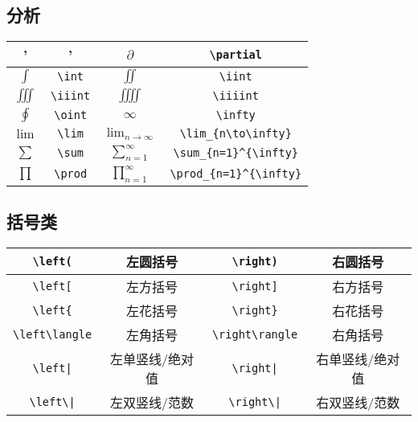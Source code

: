 \documentclass[a4paper,10pt]{ctexart}
\begin{document}
\subsection{分析}
\begin{table}[H]
	\begin{center}
		\begin{tabular}{|c|c|c|c|}
		\hline
		' &' &$\partial$ &\verb|\partial|\\
		\hline
		$\int$ &\verb|\int| &$\iint$ &\verb|\iint|\\
		\hline
		$\iiint$ &\verb|\iiint| &$\iiiint$ &\verb|\iiiint|\\
		\hline
		$\oint$ &\verb|\oint| &$\infty$ &\verb|\infty|\\
		\hline
		$\lim$ &\verb|\lim| &$\lim_{n\to\infty}$ &\verb|\lim_{n\to\infty}|\\
		\hline
		$\sum$ &\verb|\sum| &$\sum_{n=1}^{\infty}$ &\verb|\sum_{n=1}^{\infty}|\\
		\hline
		$\prod$ &\verb|\prod|&$\prod_{n=1}^{\infty}$ &\verb|\prod_{n=1}^{\infty}|\\
		\hline
		\end{tabular}
	\end{center}
\end{table}


\subsection{括号类}
\noindent
\begin{table}[H]
	\begin{center}
		\begin{tabular}{|c|c|c|c|}
		\hline
		\verb|\left(| &左圆括号 &\verb|\right)| &右圆括号\\
		\hline
		\verb|\left[| &左方括号 &\verb|\right]| &右方括号\\
		\hline
		\verb|\left{| &左花括号 &\verb|\right}| &右花括号\\
		\hline
		\verb|\left\langle| &左角括号 &\verb|\right\rangle| &右角括号\\
		\hline
		\verb'\left|' &左单竖线/绝对值 &\verb'\right|' &右单竖线/绝对值\\
		\hline
		\verb'\left\|' &左双竖线/范数 &\verb'\right\|' &右双竖线/范数\\
		\hline
		\end{tabular}
	\end{center}
\end{table}
\end{document}
